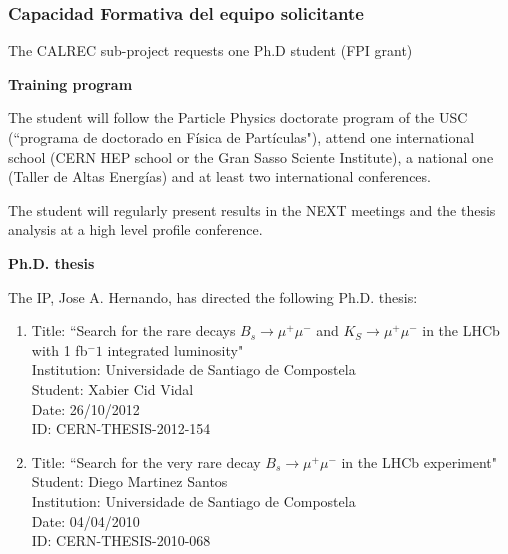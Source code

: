 %
%

\subsubsection*{Capacidad Formativa del equipo solicitante}

The CALREC sub-project requests one Ph.D student (FPI grant)

{\bf Training program}

The student will follow the Particle Physics doctorate program of the USC (``programa de doctorado en F\'isica de Part\'iculas"), attend one international school (CERN HEP school or the Gran Sasso Sciente Institute), a national one (Taller de Altas Energ\'ias) and at least two international conferences.

The student will regularly present results in the NEXT meetings and the thesis analysis at  a high level profile conference.

{\bf Ph.D. thesis}

The IP, Jose A. Hernando, has directed the following Ph.D. thesis:
\begin{enumerate}

\item Title: ``Search for the rare decays $B_s \to \mu^+\mu^-$
and $K_S \to \mu^+\mu^-$ in the LHCb with 1 fb$^-1$ integrated luminosity" \\
Institution: Universidade de Santiago de Compostela \\
Student: Xabier Cid Vidal \\
Date: 26/10/2012 \\
ID: CERN-THESIS-2012-154  

\item Title: ``Search for the very rare decay $B_s \to \mu^+\mu^-$ in the LHCb experiment" \\
Student: Diego Martinez Santos \\
Institution: Universidade de Santiago de Compostela \\
Date: 04/04/2010 \\
ID: CERN-THESIS-2010-068 

\end{enumerate}

